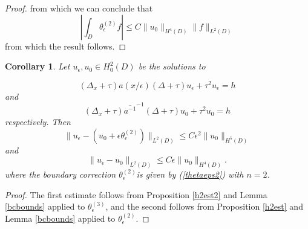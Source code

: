 \documentclass[10pt,a4paper]{amsart}
\newtheorem{corollary}{Corollary}
\begin{document}
\begin{proof}
from which we can conclude that 
$$ \left| \int_ D \theta_\epsilon^{(2)} f \right| \leq C\| u_0\|_{H^4(D)}  \| f \|_{L^2(D)}$$
from which the result follows. 
 \end{proof}
\begin{corollary} \label{l2estexpansion} Let $u_\epsilon, u_0 \in H^2_0( D)$  be the solutions to 

\begin{equation} \label{fourthordeqest2-ae2}  (\Delta_x +\tau) a(x/\epsilon) (\Delta +\tau) u_\epsilon +\tau^2 u_\epsilon= h \end{equation}
and
\begin{equation} \label{homogeqest2-ae2}  (\Delta_x +\tau) \overline{a^{-1}}^{-1} (\Delta +\tau) u_0 +\tau^2 u_0= h \end{equation}
respectively. Then 
$$ \| u_\epsilon -(u_0 + \epsilon\theta_\epsilon^{(2)} ) \|_{L^2( D)} \leq C\epsilon^2 \| u_0 \|_{H^5( D)} $$
and 
$$ \| u_\epsilon - u_0 \|_{L^2( D)} \leq C\epsilon \| u_0 \|_{H^4( D)} .$$
where the boundary correction $\theta_\epsilon^{(2)}$is given by (\ref{thetaeps2}) with $n=2$. 
\end{corollary} 
\begin{proof} The first estimate follows from Proposition \ref{h2est2} and Lemma \ref{bcbounds} applied to $\theta_\epsilon^{(3)}$, and the second follows from Proposition \ref{h2est} and Lemma \ref{bcbounds} applied to $\theta_\epsilon^{(2)}$.
\end{proof}
\end{document}
